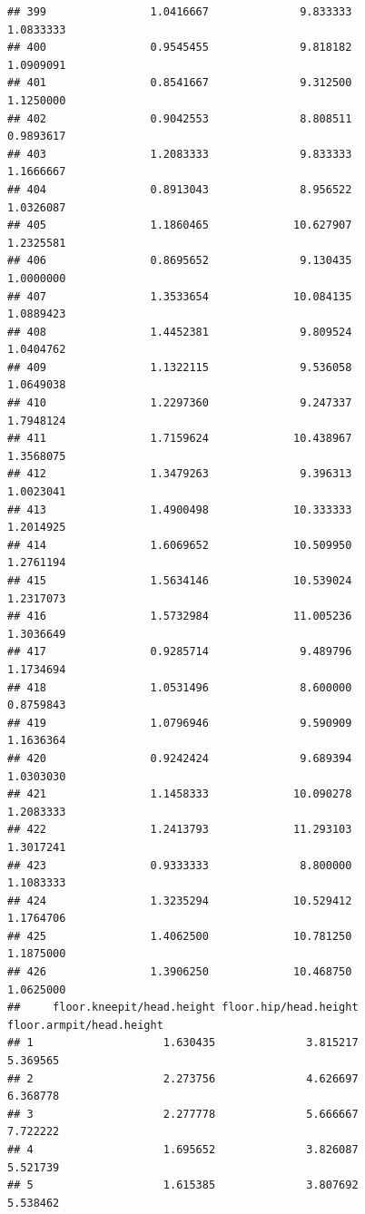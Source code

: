 \documentclass[]{article}
\begin{document}
\begin{verbatim}
## 399                1.0416667              9.833333               1.0833333
## 400                0.9545455              9.818182               1.0909091
## 401                0.8541667              9.312500               1.1250000
## 402                0.9042553              8.808511               0.9893617
## 403                1.2083333              9.833333               1.1666667
## 404                0.8913043              8.956522               1.0326087
## 405                1.1860465             10.627907               1.2325581
## 406                0.8695652              9.130435               1.0000000
## 407                1.3533654             10.084135               1.0889423
## 408                1.4452381              9.809524               1.0404762
## 409                1.1322115              9.536058               1.0649038
## 410                1.2297360              9.247337               1.7948124
## 411                1.7159624             10.438967               1.3568075
## 412                1.3479263              9.396313               1.0023041
## 413                1.4900498             10.333333               1.2014925
## 414                1.6069652             10.509950               1.2761194
## 415                1.5634146             10.539024               1.2317073
## 416                1.5732984             11.005236               1.3036649
## 417                0.9285714              9.489796               1.1734694
## 418                1.0531496              8.600000               0.8759843
## 419                1.0796946              9.590909               1.1636364
## 420                0.9242424              9.689394               1.0303030
## 421                1.1458333             10.090278               1.2083333
## 422                1.2413793             11.293103               1.3017241
## 423                0.9333333              8.800000               1.1083333
## 424                1.3235294             10.529412               1.1764706
## 425                1.4062500             10.781250               1.1875000
## 426                1.3906250             10.468750               1.0625000
##     floor.kneepit/head.height floor.hip/head.height floor.armpit/head.height
## 1                    1.630435              3.815217                 5.369565
## 2                    2.273756              4.626697                 6.368778
## 3                    2.277778              5.666667                 7.722222
## 4                    1.695652              3.826087                 5.521739
## 5                    1.615385              3.807692                 5.538462

\end{verbatim}
\end{document}
